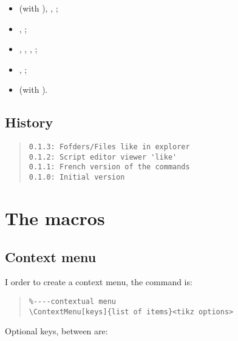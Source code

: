 \documentclass[11pt,a4paper]{ltxdoc}
\begin{document}
\begin{itemize}
	\item {} (with ), , ;
	\item {}, ;
	\item {}, , , ;
	\item {}, ;
	\item {} (with ).
\end{itemize}

\vfill

\subsection{History}

\begin{quote}
\begin{verbatim}
0.1.3: Fofders/Files like in explorer
0.1.2: Script editor viewer 'like'
0.1.1: French version of the commands
0.1.0: Initial version
\end{verbatim}
\end{quote}

\pagebreak

\section{The macros}

\subsection{Context menu}

I order to create a context menu, the command is:

\begin{quote}
\begin{verbatim}
%----contextual menu
\ContextMenu[keys]{list of items}<tikz options>
\end{verbatim}
\end{quote}

Optional keys, between \MontreCode{[...]} are:
\end{document}
